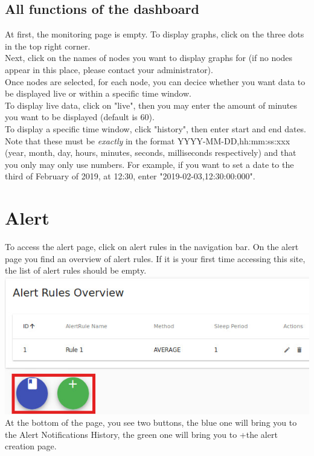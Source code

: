 \documentclass[twoside,a4paper]{refart}
\begin{document}
    \subsection{All functions of the dashboard}
    At first, the monitoring page is empty. To display graphs, click on the three dots in the top right corner. \\
    Next, click on the names of nodes you want to display graphs for (if no nodes appear in this place, please contact your administrator). \\
    Once nodes are selected, for each node, you can decice whether you want data to be displayed live or within a specific time window. \\
    To display live data, click on "live", then you may enter the amount of minutes you want to be displayed (default is 60). \\
    To display a specific time window, click "history", then enter start and end dates. Note that these must be \emph{exactly} in the format YYYY-MM-DD,hh:mm:ss:xxx (year, month, day, hours, minutes, seconds, milliseconds respectively) and that you only may only use numbers. For example, if you want to set a date to the third of February of 2019, at 12:30, enter "2019-02-03,12:30:00:000".
     

    \section{Alert}
    To access the alert page, click on alert rules in the navigation bar.
    On the alert page you find an overview of alert rules. If it is your first time accessing this site, the list of alert rules should be empty. \\
    \includegraphics[width=\linewidth]{alertoverview.jpeg} \\
    At the bottom of the page, you see two buttons, the blue one will bring  you to the Alert Notifications History, the green one will bring you to +the alert creation page.    
    
\end{document}
